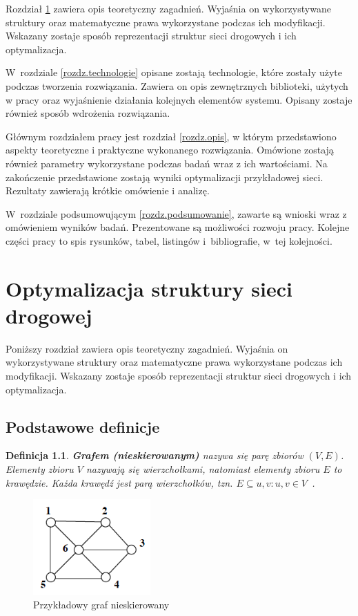 \documentclass[twoside,12pt]{report}
\let\oldsection\chapter
\def\chapter{\cleardoublepage\oldsection}
\newtheorem{definition}{Definicja} %
\begin{document}
Rozdział \ref{rozdz.optymalizacja} zawiera opis teoretyczny zagadnień. Wyjaśnia on wykorzystywane struktury oraz matematyczne prawa wykorzystane podczas ich modyfikacji. Wskazany zostaje sposób reprezentacji struktur sieci drogowych i ich optymalizacja.

W~rozdziale \ref{rozdz.technologie} opisane zostają technologie, które zostały użyte podczas tworzenia rozwiązania. Zawiera on opis zewnętrznych biblioteki, użytych w pracy oraz wyjaśnienie działania kolejnych elementów systemu. Opisany zostaje również sposób wdrożenia rozwiązania.

Głównym rozdziałem pracy jest rozdział \ref{rozdz.opis},
w którym przedstawiono aspekty teoretyczne i praktyczne wykonanego rozwiązania. Omówione zostają również parametry wykorzystane podczas badań wraz z ich wartościami. Na zakończenie przedstawione zostają wyniki optymalizacji przykładowej sieci. Rezultaty zawierają krótkie omówienie i analizę.

W~rozdziale podsumowującym \ref{rozdz.podsumowanie}, zawarte są wnioski wraz z omówieniem wyników badań. Prezentowane są możliwości rozwoju pracy. Kolejne części pracy to spis rysunków, tabel, listingów i~bibliografie, w~tej kolejności.

\chapter{Optymalizacja struktury sieci drogowej}\label{rozdz.optymalizacja} 

Poniższy rozdział zawiera opis teoretyczny zagadnień. Wyjaśnia on wykorzystywane struktury oraz matematyczne prawa wykorzystane podczas ich modyfikacji. Wskazany zostaje sposób reprezentacji struktur sieci drogowych i ich optymalizacja.

\section{Podstawowe definicje}

\begin{definition}\label{def:graf_nieskierowany}
\textbf{Grafem (nieskierowanym)} nazywa się parę zbiorów $(V,E)$. Elementy zbioru $V$ nazywają się \textit{wierzchołkami}, natomiast elementy zbioru $E$ to \textit{krawędzie}. Każda krawędź jest parą wierzchołków, tzn. $E \subseteq {{u,v}:u,v \in V}$~\cite{grafy}.
\end{definition}

\begin{figure}[htbp]
	\centering
	\includegraphics[width=0.40\textwidth]{img/graf1}
	\caption{Przykładowy graf nieskierowany} 
	\label{fig:graf_nieskierowany}
\end{figure}
\end{document}

